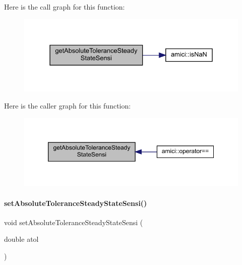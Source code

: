 Here is the call graph for this function\+:
\nopagebreak
\begin{figure}[H]
\begin{center}
\leavevmode
\includegraphics[width=331pt]{classamici_1_1_solver_ae1b148791e34ba2220eba9c75d21afb0_cgraph}
\end{center}
\end{figure}
Here is the caller graph for this function\+:
\nopagebreak
\begin{figure}[H]
\begin{center}
\leavevmode
\includegraphics[width=350pt]{classamici_1_1_solver_ae1b148791e34ba2220eba9c75d21afb0_icgraph}
\end{center}
\end{figure}
\mbox{\label{classamici_1_1_solver_a7907d753a8151ececcb4f60cb9721064}} 
\paragraph{\texorpdfstring{set\+Absolute\+Tolerance\+Steady\+State\+Sensi()}{setAbsoluteToleranceSteadyStateSensi()}}
{\footnotesize\ttfamily void set\+Absolute\+Tolerance\+Steady\+State\+Sensi (\begin{DoxyParamCaption}\item[{double}]{atol }\end{DoxyParamCaption})}


